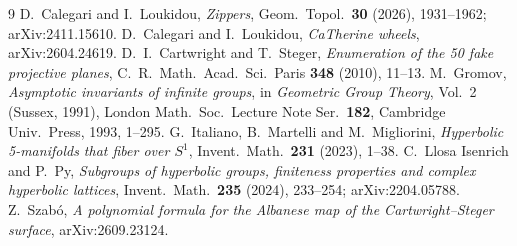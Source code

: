 \documentclass[11pt]{article}
\theoremstyle{remark}
\begin{document}
\begin{thebibliography}{9}
 D.~Calegari and I.~Loukidou, \emph{Zippers}, Geom.\ Topol.\ \textbf{30} (2026), 1931--1962; arXiv:2411.15610.
 D.~Calegari and I.~Loukidou, \emph{CaTherine wheels}, arXiv:2604.24619.
 D.~I.~Cartwright and T.~Steger, \emph{Enumeration of the 50 fake projective planes}, C.~R.~Math.~Acad.~Sci.\
Paris \textbf{348} (2010), 11--13.
 M.~Gromov, \emph{Asymptotic invariants of infinite groups}, in \emph{Geometric Group Theory}, Vol.~2
(Sussex, 1991), London Math.\ Soc.\ Lecture Note Ser.\ \textbf{182}, Cambridge Univ.\ Press, 1993, 1--295.
\bibitem{IMM} G.~Italiano, B.~Martelli and M.~Migliorini, \emph{Hyperbolic 5-manifolds that fiber over $S^1$}, Invent.\
Math.\ \textbf{231} (2023), 1--38.
\bibitem{LIP} C.~Llosa Isenrich and P.~Py, \emph{Subgroups of hyperbolic groups, finiteness properties and complex
hyperbolic lattices}, Invent.\ Math.\ \textbf{235} (2024), 233--254; arXiv:2204.05788.
\bibitem{Sz} Z.~Szab\'o, \emph{A polynomial formula for the Albanese map of the Cartwright--Steger surface},
arXiv:2609.23124.
\end{thebibliography}
\end{document}
